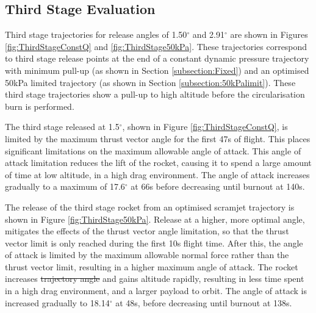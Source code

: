 \documentclass[journal]{new-aiaa}
\newcommand{\SeparationAngleConstq}{1.50}
\newcommand{\SeparationAngleFiftykPa}{2.91}
\providecommand{\DIFadd}[1]{{\protect\color{blue}\uwave{#1}}} %
\providecommand{\DIFdel}[1]{{\protect\color{red}\sout{#1}}}                      %
\providecommand{\DIFaddbegin}{} %
\providecommand{\DIFaddend}{} %
\providecommand{\DIFdelbegin}{} %
\providecommand{\DIFdelend}{} %
\newcommand{\DIFscaledelfig}{0.5}
\newlength{\DIFdelgraphicswidth} %
\newlength{\DIFdelgraphicsheight} %
\newcommand{\DIFaddincludegraphics}[2][]{{\color{blue}\fbox{\DIFOincludegraphics[#1]{#2}}}} %
\newcommand{\DIFdelincludegraphics}[2][]{%
\sbox{\DIFdelgraphicsbox}{\DIFOincludegraphics[#1]{#2}}%
\settoboxwidth{\DIFdelgraphicswidth}{\DIFdelgraphicsbox} %
\settoboxtotalheight{\DIFdelgraphicsheight}{\DIFdelgraphicsbox} %
\scalebox{\DIFscaledelfig}{%
\parbox[b]{\DIFdelgraphicswidth}{\usebox{\DIFdelgraphicsbox}\\[-\baselineskip] \rule{\DIFdelgraphicswidth}{0em}}\llap{\resizebox{\DIFdelgraphicswidth}{\DIFdelgraphicsheight}{%
\setlength{\unitlength}{\DIFdelgraphicswidth}%
\begin{picture}(1,1)%
\thicklines\linethickness{2pt} %
{\color[rgb]{1,0,0}\put(0,0){\framebox(1,1){}}}%
{\color[rgb]{1,0,0}\put(0,0){\line( 1,1){1}}}%
{\color[rgb]{1,0,0}\put(0,1){\line(1,-1){1}}}%
\end{picture}%
}\hspace*{3pt}}} %
} %
\DeclareRobustCommand{\DIFaddbegin}{\DIFOaddbegin \let\includegraphics\DIFaddincludegraphics} %
\DeclareRobustCommand{\DIFaddend}{\DIFOaddend \let\includegraphics\DIFOincludegraphics} %
\DeclareRobustCommand{\DIFdelbegin}{\DIFOdelbegin \let\includegraphics\DIFdelincludegraphics} %
\DeclareRobustCommand{\DIFdelend}{\DIFOaddend \let\includegraphics\DIFOincludegraphics} %
\begin{document}
 
\subsection{Third Stage Evaluation}

Third stage trajectories for release angles of \SeparationAngleConstq $^\circ$ and \SeparationAngleFiftykPa $^\circ$ are shown in Figures \ref{fig:ThirdStageConstQ} and \ref{fig:ThirdStage50kPa}. 
These trajectories correspond to third stage release points at the end of a constant dynamic pressure trajectory with minimum pull-up (as shown in Section \ref{subsection:Fixed}) and an optimised 50kPa limited trajectory  (as shown in Section \ref{subsection:50kPalimit}). 
These third stage trajectories show a pull-up to high altitude before the circularisation burn is performed. 

The third stage released at 1.5$^\circ$, shown in Figure \ref{fig:ThirdStageConstQ}, is limited by the maximum thrust vector angle for the first 47s of flight. This places significant limitations on the maximum allowable angle of attack. This angle of attack limitation reduces the lift of the rocket, causing it to spend a large amount of time at low altitude, in a high drag environment. The angle of attack increases gradually to a maximum of 17.6$^\circ$ at 66s before decreasing until burnout at 140s. 

The release of the third stage rocket from an optimised scramjet trajectory is shown in Figure \ref{fig:ThirdStage50kPa}. Release at a higher, more optimal angle, mitigates the effects of the thrust vector angle limitation, so that the thrust vector limit is only reached during the first 10s flight time. After this, the angle of attack is limited by the maximum allowable normal force rather than the thrust vector limit, resulting in a higher maximum angle of attack. The rocket increases \DIFdelbegin \DIFdel{trajectory angle }\DIFdelend \DIFaddbegin \DIFadd{\textcolor{red}{flight path angle} }\DIFaddend and gains altitude rapidly, resulting in less time spent in a high drag environment, and a larger payload to orbit.  The angle of attack is increased gradually to 18.14$^\circ$ at 48s, before decreasing until burnout at 138s.
\end{document}
